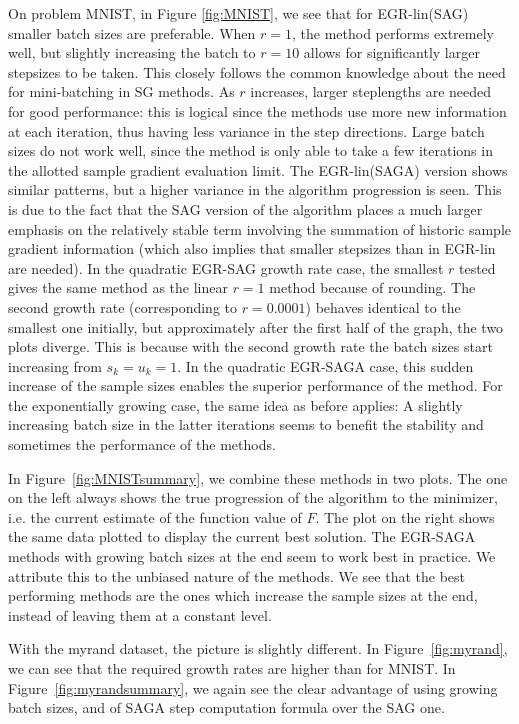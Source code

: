 \documentclass[11pt]{article}
\begin{document}
   
		 
	     On problem MNIST, in Figure \ref{fig:MNIST}, we see that for EGR-lin(SAG) smaller batch sizes are preferable. When $r=1$, the method performs extremely well, but slightly increasing the batch to $r=10$ allows for significantly larger stepsizes to be taken. This closely follows the common knowledge about the need for mini-batching in SG methods. As $r$ increases, larger steplengths are needed for good performance: this is logical since the methods use more new information at each iteration, thus having less variance in the step directions. Large batch sizes do not work well, since the method is only able to take a few iterations in the allotted sample gradient evaluation limit. The EGR-lin(SAGA) version shows similar patterns, but a higher variance in the algorithm progression is seen. This is due to the fact that the SAG version of the algorithm places a much larger emphasis on the relatively stable term involving the summation of historic sample gradient information (which also implies that smaller 
stepsizes than in EGR-lin are needed). In the quadratic EGR-SAG growth rate case, the smallest $r$ tested gives the same method as the linear $r=1$ method because of rounding. The second growth rate (corresponding to $r=0.0001$) behaves identical to the smallest one initially, but approximately after the first half of the graph, the two plots diverge. This is because with the second growth rate the batch sizes start increasing from $s_k=u_k=1$. In the quadratic EGR-SAGA case, this sudden increase of the sample sizes enables the superior performance of the method. For the exponentially growing case, the same idea as before applies: A slightly increasing batch size in the latter iterations seems to benefit the stability and sometimes the performance of the methods.
   
	     In Figure~\ref{fig:MNISTsummary}, we combine these methods in two plots. The one on the left always shows the true progression of the algorithm to the minimizer, i.e. the current estimate of the function value of $F$. The plot on the right shows the same data plotted to display the current best solution. The EGR-SAGA methods with growing batch sizes at the end seem to work best in practice. We attribute this to the unbiased nature of the methods. We see that the best performing methods are the ones which increase the sample sizes at the end, instead of leaving them at a constant level. 
   
	     With the myrand dataset, the picture is slightly different. In Figure~\ref{fig:myrand}, we can see that the required growth rates are higher than for MNIST. In Figure~\ref{fig:myrandsummary}, we again see the clear advantage of using growing batch sizes, and of SAGA step computation formula over the SAG one. 
   
\end{document}
